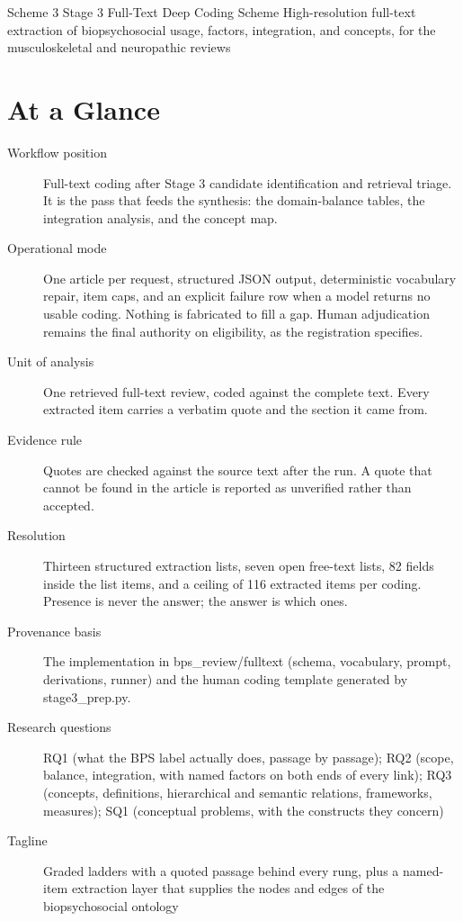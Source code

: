 \documentclass[11pt]{article}
\begin{document}
\schemeheader
  {Scheme 3}
  {Stage 3 Full-Text Deep Coding Scheme}
  {High-resolution full-text extraction of biopsychosocial usage, factors, integration, and concepts, for the musculoskeletal and neuropathic reviews}


\section*{At a Glance}
\begin{description}
\item[Workflow position] Full-text coding after Stage 3 candidate identification and retrieval triage. It is the pass that feeds the synthesis: the domain-balance tables, the integration analysis, and the concept map.
\item[Operational mode] One article per request, structured JSON output, deterministic vocabulary repair, item caps, and an explicit failure row when a model returns no usable coding. Nothing is fabricated to fill a gap. Human adjudication remains the final authority on eligibility, as the registration specifies.
\item[Unit of analysis] One retrieved full-text review, coded against the complete text. Every extracted item carries a verbatim quote and the section it came from.
\item[Evidence rule] Quotes are checked against the source text after the run. A quote that cannot be found in the article is reported as unverified rather than accepted.
\item[Resolution] Thirteen structured extraction lists, seven open free-text lists, 82 fields inside the list items, and a ceiling of 116 extracted items per coding. Presence is never the answer; the answer is which ones.
\item[Provenance basis] The implementation in bps\_review/fulltext (schema, vocabulary, prompt, derivations, runner) and the human coding template generated by stage3\_prep.py.
\item[Research questions] RQ1 (what the BPS label actually does, passage by passage); RQ2 (scope, balance, integration, with named factors on both ends of every link); RQ3 (concepts, definitions, hierarchical and semantic relations, frameworks, measures); SQ1 (conceptual problems, with the constructs they concern)
\item[Tagline] Graded ladders with a quoted passage behind every rung, plus a named-item extraction layer that supplies the nodes and edges of the biopsychosocial ontology
\end{description}
\end{document}
